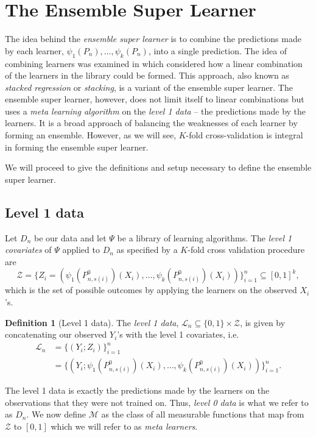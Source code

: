 \documentclass[11pt, a4paper]{article}
\theoremstyle{definition}
\newtheorem{definition}[theorem]{Definition}
\theoremstyle{remark}
\newcommand{\ml}{k}
\newcommand{\la}{\psi}
\newcommand{\lib}{\Psi}
\newcommand{\lone}{\mathcal{L}}
\begin{document}
\section{The Ensemble Super Learner}
The idea behind the \textit{ensemble super learner} is to combine the predictions made by each learner, $\la_1(P_{n}), \ldots, \la_k(P_{n}) $, into a single prediction. The idea of combining learners was examined in \citet{breiman1996stacked} which considered how a linear combination of the learners in the library could be formed. This approach, also known as \textit{stacked regression} or \textit{stacking}, is a variant of the ensemble super learner. The ensemble super learner, however, does not limit itself to linear combinations but uses a \textit{meta learning algorithm} on the \textit{level 1 data} -- the predictions made by the learners. It is a broad approach of balancing the weaknesses of each learner by forming an ensemble. However, as we will see, $ K $-fold cross-validation is integral in forming the ensemble super learner. 

We will proceed to give the definitions and setup necessary to define the ensemble super learner.
\subsection{Level 1 data}
Let $ D_n $ be our data and let $ \lib $ be a library of learning algorithms. The \textit{level 1 covariates} of $ \lib $ applied to $ D_n $ as specified by a $ K $-fold cross validation procedure are
$$ \mathcal{Z} = \{Z_i = (\la_1(P_{n, s(i)}^{0})(X_i), \ldots, \la_\ml(P_{n, s(i)}^0)(X_i) ) \}_{i = 1}^{n} \subseteq [0,1]^{k}, $$
which is the set of possible outcomes by applying the learners on the observed $ X_i $'s. 

\begin{definition}[Level 1 data]
    The \textit{level 1 data}, $ \lone_{n} \subseteq \{0,1\} \times \mathcal{Z} $, is given by concatenating our observed $ Y_i $'s with the level 1 covariates, i.e.
    \begin{align*}
        \lone_{n} &= \{(Y_i ; Z_i)\}_{i = 1}^{n} \\
            &= \{(Y_i; \la_1(P_{n, s(i)}^{0})(X_i), \ldots, \la_\ml(P_{n, s(i)}^{0})(X_i)) \}_{i = 1}^n. 
    \end{align*}
\end{definition}
The level 1 data is exactly the predictions made by the learners on the observations that they were not trained on. Thus, \textit{level 0 data} is what we refer to as $ D_n $. 
We now define $ \mathcal{M} $ as the class of all measurable functions that map from $ \mathcal{Z} $ to $ [0,1] $ which we will refer to as \textit{meta learners}. 
\end{document}
